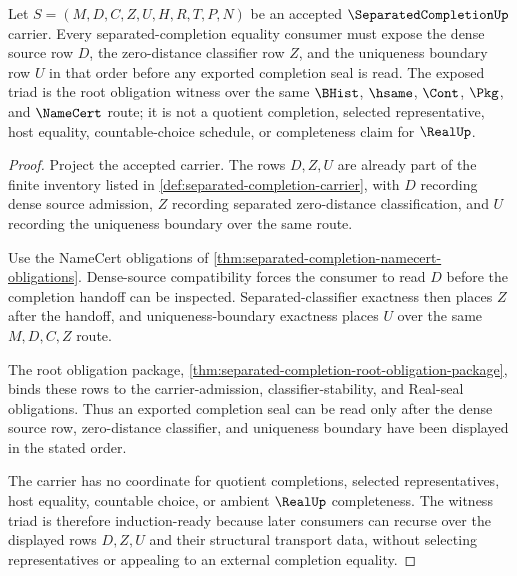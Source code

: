 \begin{theorem}
\label{thm:separated-completion-separated-witness-triad}
Let $S=(M,D,C,Z,U,H,R,T,P,N)$ be an accepted $\SeparatedCompletionUp$ carrier. Every separated-completion equality consumer must expose the dense source row $D$, the zero-distance classifier row $Z$, and the uniqueness boundary row $U$ in that order before any exported completion seal is read. The exposed triad is the root obligation witness over the same $\BHist$, $\hsame$, $\Cont$, $\Pkg$, and $\NameCert$ route; it is not a quotient completion, selected representative, host equality, countable-choice schedule, or completeness claim for $\RealUp$.
\end{theorem}
\begin{proof}
Project the accepted carrier. The rows $D,Z,U$ are already part of the finite inventory listed in \autoref{def:separated-completion-carrier}, with $D$ recording dense source admission, $Z$ recording separated zero-distance classification, and $U$ recording the uniqueness boundary over the same route.

Use the NameCert obligations of \autoref{thm:separated-completion-namecert-obligations}. Dense-source compatibility forces the consumer to read $D$ before the completion handoff can be inspected. Separated-classifier exactness then places $Z$ after the handoff, and uniqueness-boundary exactness places $U$ over the same $M,D,C,Z$ route.

The root obligation package, \autoref{thm:separated-completion-root-obligation-package}, binds these rows to the carrier-admission, classifier-stability, and Real-seal obligations. Thus an exported completion seal can be read only after the dense source row, zero-distance classifier, and uniqueness boundary have been displayed in the stated order.

The carrier has no coordinate for quotient completions, selected representatives, host equality, countable choice, or ambient $\RealUp$ completeness. The witness triad is therefore induction-ready because later consumers can recurse over the displayed rows $D,Z,U$ and their structural transport data, without selecting representatives or appealing to an external completion equality.
\end{proof}
